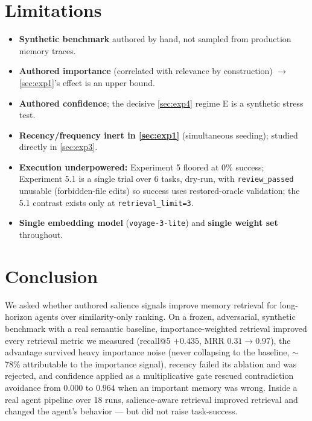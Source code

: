 \documentclass[11pt]{article}
\begin{document}
\section{Limitations}
\label{sec:limitations}
\begin{itemize}[leftmargin=1.4em,itemsep=2pt]
\item \textbf{Synthetic benchmark} authored by hand, not sampled from production memory
traces.
\item \textbf{Authored importance} (correlated with relevance by construction) $\to$
\cref{sec:exp1}'s effect is an upper bound.
\item \textbf{Authored confidence}; the decisive \cref{sec:exp4} regime E is a synthetic
stress test.
\item \textbf{Recency/frequency inert in \cref{sec:exp1}} (simultaneous seeding); studied
directly in \cref{sec:exp3}.
\item \textbf{Execution underpowered:} Experiment 5 floored at 0\% success; Experiment 5.1
is a single trial over 6 tasks, dry-run, with \texttt{review\_passed} unusable
(forbidden-file edits) so success uses restored-oracle validation; the 5.1 contrast exists
only at \texttt{retrieval\_limit=3}.
\item \textbf{Single embedding model} (\texttt{voyage-3-lite}) and \textbf{single weight
set} throughout.
\end{itemize}

\section{Conclusion}
\label{sec:conclusion}

We asked whether authored salience signals improve memory retrieval for long-horizon agents
over similarity-only ranking. On a frozen, adversarial, synthetic benchmark with a real
semantic baseline, importance-weighted retrieval improved every retrieval metric we measured
(recall@5 $+0.435$, MRR $0.31\to0.97$), the advantage survived heavy importance noise (never
collapsing to the baseline, $\sim$78\% attributable to the importance signal), recency
failed its ablation and was rejected, and confidence applied as a multiplicative gate
rescued contradiction avoidance from $0.000$ to $0.964$ when an important memory was wrong.
Inside a real agent pipeline over 18 runs, salience-aware retrieval improved retrieval and
changed the agent's behavior --- but did not raise task-success.
\end{document}
